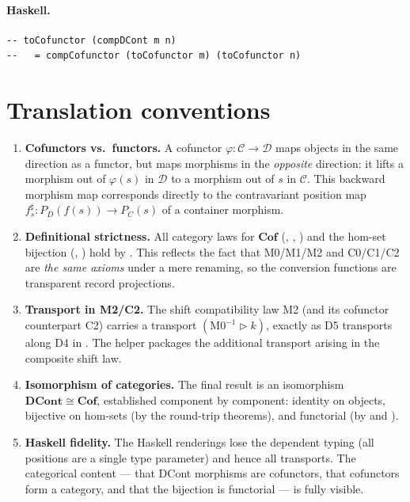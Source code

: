 \documentclass[11pt,a4paper]{article}
\begin{document}
\paragraph{Haskell.}
\begin{lstlisting}[style=haskell]
-- toCofunctor (compDCont m n)
--   = compCofunctor (toCofunctor m) (toCofunctor n)
\end{lstlisting}


\section{Translation conventions}

\begin{enumerate}
\item \textbf{Cofunctors vs.\ functors.}  A cofunctor $\varphi : \mathcal{C}
  \to \mathcal{D}$ maps objects in the same direction as a functor, but maps
  morphisms in the \emph{opposite} direction: it lifts a morphism out of
  $\varphi(s)$ in $\mathcal{D}$ to a morphism out of $s$ in $\mathcal{C}$.
  This backward morphism map corresponds directly to the contravariant position
  map $f^\sharp_s : P_D(f(s)) \to P_C(s)$ of a container morphism.

\item \textbf{Definitional strictness.}  All category laws for $\mathbf{Cof}$
  (, , ) and the hom-set
  bijection (,
  ) hold by .  This reflects the
  fact that M0/M1/M2 and C0/C1/C2 are \emph{the same axioms} under a mere
  renaming, so the conversion functions are transparent record projections.

\item \textbf{Transport in M2/C2.}  The shift compatibility law M2 (and its
  cofunctor counterpart C2) carries a transport $(\mathrm{M0}^{-1} \triangleright
  k)$, exactly as D5 transports along D4 in .  The
  helper  packages the additional transport
  arising in the composite shift law.

\item \textbf{Isomorphism of categories.}  The final result is an isomorphism
  $\mathbf{DCont} \cong \mathbf{Cof}$, established component by component:
  identity on objects, bijective on hom-sets (by the round-trip theorems), and
  functorial (by  and ).

\item \textbf{Haskell fidelity.}  The Haskell renderings lose the dependent
  typing (all positions are a single type parameter) and hence all transports.
  The categorical content --- that DCont morphisms are cofunctors, that
  cofunctors form a category, and that the bijection is functorial --- is fully
  visible.
\end{enumerate}
\end{document}
